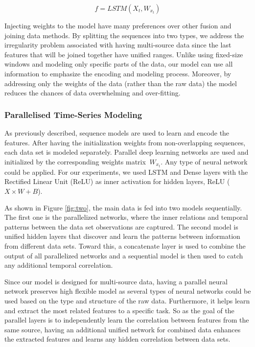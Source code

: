 \documentclass[conference]{IEEEtran}
\begin{document}
\begin{equation}
f = LSTM(X_{t} , W_{x_{t}})
\end{equation}

Injecting weights to the model have many preferences over other fusion and joining data methods. By splitting the sequences into two types, we address the irregularity problem associated with having multi-source data since the last features that will be joined together have unified ranges. Unlike using fixed-size windows and modeling only specific parts of the data, our model can use all information to emphasize the encoding and modeling process. Moreover, by addressing only the weights of the data (rather than the raw data) the model reduces the chances of data overwhelming and over-fitting.

\subsubsection{Parallelised Time-Series Modeling}
As previously described, sequence models are used to learn and encode the features. After having the initialization weights from non-overlapping sequences, each data set is modeled separately. Parallel deep learning networks are used and initialized by the corresponding weights matrix $\ W_{x_{t}} $.  Any type of neural network could be applied. For our experiments, we used LSTM and Dense layers with the Rectified Linear Unit (ReLU) as inner activation for hidden layers, ReLU ($X \times W + B$).

As shown in Figure \ref{fig:two}, the main data is fed into two models sequentially. The first one is the parallelized networks, where the inner relations and temporal patterns between the data set observations are captured. The second model is unified hidden layers that discover and learn the patterns between information from different data sets. Toward this, a concatenate layer is used to combine the output of all parallelized networks and a sequential model is then used to catch any additional temporal correlation.

Since our model is designed for multi-source data, having a parallel neural network preserves high flexible model as several types of neural networks could be used based on the type and structure of the raw data. Furthermore, it helps learn and extract the most related features to a specific task. So as the goal of the parallel layers is to independently learn the correlation between features from the same source, having an additional unified network for combined data enhances the extracted features and learns any hidden correlation between data sets.
 
\end{document}
